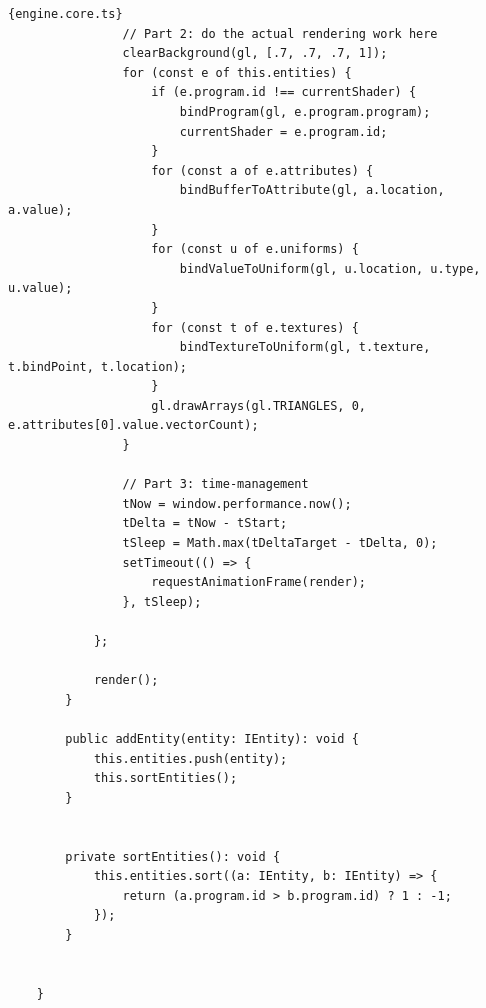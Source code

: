 \begin{lstlisting}{engine.core.ts}
                // Part 2: do the actual rendering work here
                clearBackground(gl, [.7, .7, .7, 1]);
                for (const e of this.entities) {
                    if (e.program.id !== currentShader) {
                        bindProgram(gl, e.program.program);
                        currentShader = e.program.id;
                    }
                    for (const a of e.attributes) {
                        bindBufferToAttribute(gl, a.location, a.value);
                    }
                    for (const u of e.uniforms) {
                        bindValueToUniform(gl, u.location, u.type, u.value);
                    }
                    for (const t of e.textures) {
                        bindTextureToUniform(gl, t.texture, t.bindPoint, t.location);
                    }
                    gl.drawArrays(gl.TRIANGLES, 0, e.attributes[0].value.vectorCount);
                }
    
                // Part 3: time-management
                tNow = window.performance.now();
                tDelta = tNow - tStart;
                tSleep = Math.max(tDeltaTarget - tDelta, 0);
                setTimeout(() => {
                    requestAnimationFrame(render);
                }, tSleep);
    
            };
    
            render();
        }
    
        public addEntity(entity: IEntity): void {
            this.entities.push(entity);
            this.sortEntities();
        }
    
    
        private sortEntities(): void {
            this.entities.sort((a: IEntity, b: IEntity) => {
                return (a.program.id > b.program.id) ? 1 : -1;
            });
        }
    
    
    }
\end{lstlisting}

